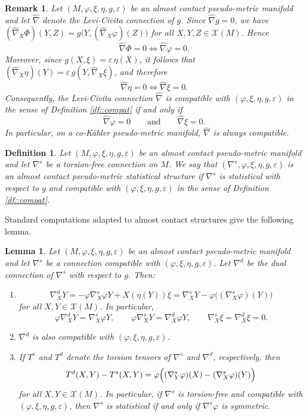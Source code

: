 \documentclass[12pt,a4paper,final]{amsart}
\numberwithin{equation}{section}
\newtheorem{lm}[tw]{Lemma}
\newtheorem{uw}[tw]{Remark}
\theoremstyle{df}
\newtheorem{df}[tw]{Definition}
\newcommand{\X}{\mathcal{X}}
\newcommand{\XM}{\X(M)}
\newcommand{\eps}{\varepsilon}
\begin{document}
\begin{uw}\label{uw::LC::compat}
Let $(M,\varphi,\xi,\eta,g,\eps)$ be an almost contact pseudo-metric manifold
and let $\widehat{\nabla}$ denote the Levi-Civita connection of $g$. Since $\widehat{\nabla}g=0$,
we have $(\widehat{\nabla}_X\Phi)(Y,Z)=g\bigl(Y,(\widehat{\nabla}_X\varphi)(Z)\bigr)$
for all $X,Y,Z\in\XM$. Hence
$$
\widehat{\nabla}\Phi=0 \iff \widehat{\nabla}\varphi=0.
$$
Moreover, since $g(X,\xi)=\eps\,\eta(X)$, it follows that $(\widehat{\nabla}_X\eta)(Y)=\eps\,g(Y,\widehat{\nabla}_X\xi)$,
and therefore
$$
\widehat{\nabla}\eta=0\iff\widehat{\nabla}\xi=0.
$$
Consequently, the Levi-Civita connection $\widehat{\nabla}$ is compatible with
$(\varphi,\xi,\eta,g,\eps)$ in the sense of Definition \ref{df::compat} if and
only if
$$
\widehat{\nabla}\varphi=0\qquad\text{and}\qquad\widehat{\nabla}\xi=0.
$$
In particular, on a co-K\"ahler pseudo-metric manifold, $\widehat{\nabla}$ is
always compatible.
\end{uw}

\begin{df}\label{df::acstat}
Let $(M,\varphi,\xi,\eta,g,\eps)$ be an almost contact pseudo-metric manifold
and let $\nabla^s$ be a torsion-free connection on $M$. We say that
$(\nabla^s,\varphi,\xi,\eta,g,\eps)$ is an
\emph{almost contact pseudo-metric statistical structure} if
$\nabla^s$ is statistical with respect to $g$ and compatible with
$(\varphi,\xi,\eta,g,\eps)$ in the sense of Definition \ref{df::compat}.
\end{df}
Standard computations adapted to almost contact structures give the following lemma.
\begin{lm}\label{lm::dual}
Let $(M,\varphi,\xi,\eta,g,\eps)$ be an almost contact pseudo-metric manifold
and let $\nabla^s$ be a connection compatible with
$(\varphi,\xi,\eta,g,\eps)$.
Let $\nabla^d$ be the dual connection of $\nabla^s$ with respect to $g$. Then:
\begin{enumerate}
\item
\begin{equation}\label{eq::dual::formula}
\nabla^d_XY=-\varphi\nabla^s_X\varphi Y+X(\eta(Y))\xi=\nabla^s_XY-\varphi\bigl((\nabla^s_X\varphi)(Y)\bigr)
\end{equation}
for all $X,Y\in\XM$. In particular,
\begin{equation}\label{eq::dual::phi}
\varphi\nabla^d_XY=\nabla^s_X\varphi Y,
\qquad
\varphi\nabla^s_XY=\nabla^d_X\varphi Y,
\qquad
\nabla^s_X\xi=\nabla^d_X\xi=0.
\end{equation}
\item
$\nabla^d$ is also compatible with $(\varphi,\xi,\eta,g,\eps)$.
\item
If $T^s$ and $T^d$ denote the torsion tensors of $\nabla^s$ and $\nabla^d$,
respectively, then
\begin{equation}\label{eq::dual::torsion}
T^d(X,Y)-T^s(X,Y)=\varphi\Bigl((\nabla^s_Y\varphi)(X)-(\nabla^s_X\varphi)(Y)\Bigr)
\end{equation}
for all $X,Y\in\XM$.
In particular, if $\nabla^s$ is torsion-free and compatible with
$(\varphi,\xi,\eta,g,\eps)$, then $\nabla^s$ is statistical if and only if
$\nabla^s\varphi$ is symmetric.
\end{enumerate}
\end{lm}
\end{document}
